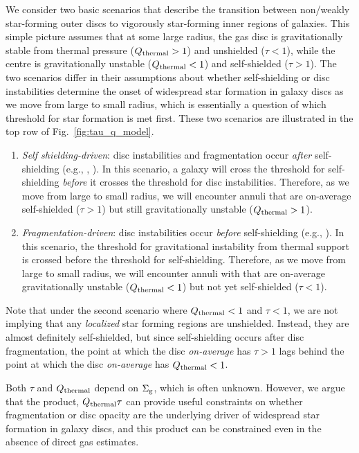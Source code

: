\documentclass[fleqn,usenatbib]{mnras}
\newcommand{\qh}{Q_{\rm thermal}}
\begin{document}
We consider two basic scenarios that describe the transition between non/weakly star-forming outer discs to vigorously star-forming inner regions of galaxies.  This simple picture assumes that at some large radius, the gas disc is gravitationally stable from thermal pressure ($\qh>1$) and unshielded ($\tau<1$), while the centre is gravitationally unstable ($\qh<1$) and self-shielded ($\tau>1$). The two scenarios differ in their assumptions about whether self-shielding or disc instabilities determine the onset of widespread star formation in galaxy discs as we move from large to small radius, which is essentially a question of which threshold for star formation is met first.  These two scenarios are illustrated in the top row of Fig.~\ref{fig:tau_q_model}.
\begin{enumerate}
\item {\it Self shielding-driven}: disc instabilities and fragmentation occur {\it after} self-shielding (e.g., \citealt{Schaye04}, \citealt{Krumholz09}). In this scenario, a galaxy will cross the threshold for self-shielding {\it before} it crosses the threshold for disc instabilities. Therefore, as we move from large to small radius, we will encounter annuli that are on-average self-shielded ($\tau > 1$) but still gravitationally unstable ($\qh>1$).
\item {\it Fragmentation-driven}: disc instabilities occur {\it before} self-shielding (e.g., \citealt{Orr17}). In this scenario, the threshold for gravitational instability from thermal support is crossed before the threshold for self-shielding. Therefore, as we move from large to small radius, we will encounter annuli with that are on-average gravitationally unstable ($\qh<1$) but not yet self-shielded ($\tau<1$). 
\end{enumerate} 

Note that under the second scenario where $\qh<1$ and $\tau<1$, we are not implying that any {\it localized} star forming regions are unshielded. Instead, they are almost definitely self-shielded, but since self-shielding occurs after disc fragmentation, the point at which the disc {\it on-average} has $\tau>1$ lags behind the point at which the disc {\it on-average} has $\qh<1$.

Both $\tau$ and $\qh$ depend on $\Sigma_{\rm g}$, which is often unknown.  However, we argue that the product, $\qh\tau$ can provide useful constraints on whether fragmentation or disc opacity are the underlying driver of widespread star formation in galaxy discs, and this product can be constrained even in the absence of direct gas estimates.  
\end{document}
